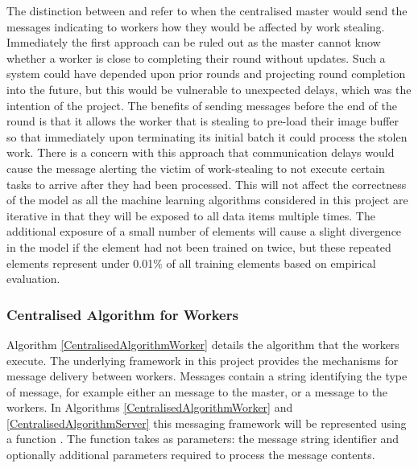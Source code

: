 \documentclass[12pt]{article}
\begin{document}
The distinction between  and  refer to when the centralised master would send the messages indicating to workers how they would be affected by work stealing. Immediately the first approach can be ruled out as the master cannot know whether a worker is close to completing their round without updates. Such a system could have depended upon prior rounds and projecting round completion into the future, but this would be vulnerable to unexpected delays, which was the intention of the project.
\newline
\newline
The benefits of sending messages before the end of the round is that it allows the worker that is stealing to pre-load their image buffer so that immediately upon terminating its initial batch it could process the stolen work. There is a concern with this approach that communication delays would cause the message alerting the victim of work-stealing to not execute certain tasks to arrive after they had been processed. This will not affect the correctness of the model as all the machine learning algorithms considered in this project are iterative in that they will be exposed to all data items multiple times. The additional exposure of a small number of elements will cause a slight divergence in the model if the element had not been trained on twice, but these repeated elements represent under 0.01\% of all training elements based on empirical evaluation.

\subsubsection{Centralised Algorithm for Workers}

Algorithm \ref{CentralisedAlgorithmWorker} details the algorithm that the workers execute. The underlying framework in this project provides the mechanisms for message delivery between workers. Messages contain a string identifying the type of message, for example either an  message to the master, or a  message to the workers.
\newline
In Algorithms \ref{CentralisedAlgorithmWorker} and \ref{CentralisedAlgorithmServer} this messaging framework will be represented using a function . The  function takes as parameters: the message string identifier and optionally additional parameters required to process the message contents.
\end{document}
